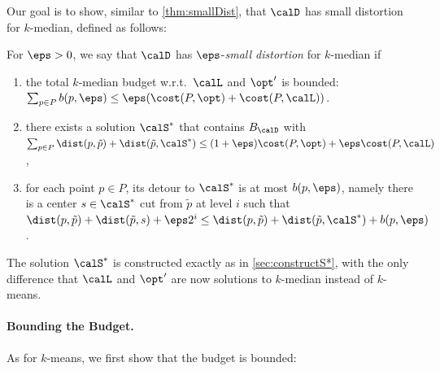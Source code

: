 Our goal is to show, similar to \cref{thm:smallDist}, that $\calD$ has small distortion for $k$-median, defined as follows:
\begin{definition}\label{def:smallDistKmed}
For $\eps  > 0$, we say that $\calD$ has $\eps$-\emph{small distortion} for $k$-median if 
\begin{enumerate}
\item\label{prop:budgetKmed} the total $k$-median budget w.r.t.\ $\calL$ and $\opt'$ is bounded: $\sum_{p \in P} b(p, \eps) \leq \eps (\cost(P, \opt) + \cost(P, \calL))$.
\item\label{prop:costSstarKmed} there exists a solution $ \calS^*$ that contains $B_{\calD}$ 
with $\sum_{p \in P}  \dist(p, \tilde p) + \dist(\tilde p,  \calS^*) \leq (1+\eps)\cost(P, \opt) + \eps \cost(P, \calL)$,
\item\label{prop:detKmed} for each point $p \in P$, its detour to $\calS^*$ is at most $b(p, \eps)$, namely there is a center $s \in \calS^*$ cut from $\tilde p$ at level $i$ such that $\dist(p, \tilde p) + \dist(\tilde p, s) + \eps 2^i \leq \dist(p, \tilde p) + \dist(\tilde p, \calS^*) + b(p, \eps)$.
\end{enumerate}
\end{definition}

The solution $\calS^*$ is constructed exactly as in \cref{sec:constructS*}, with the only difference that $\calL$ and $\opt'$ are now solutions to $k$-median instead of $k$-means.

\paragraph{Bounding the Budget.}

As for $k$-means, we first show that the budget is bounded:

